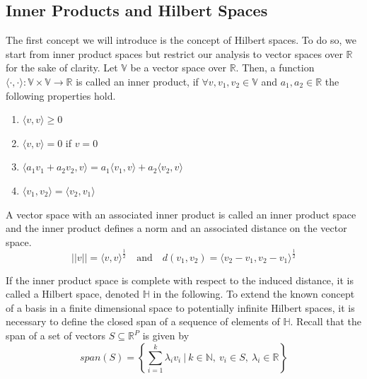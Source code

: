 \documentclass[11pt,twoside,a4paper]{article}
\begin{document}
	\subsection{Inner Products and Hilbert Spaces}
	The first concept we will introduce is the concept of Hilbert spaces. To do so, we start from inner product spaces but restrict our analysis to vector spaces over $\mathbb{R}$ for the sake of clarity. Let $\mathbb{V}$ be a vector space over $\mathbb{R}$.  Then, a function $\langle \cdot, \cdot \rangle : \mathbb{V} \times  \mathbb{V} \rightarrow \mathbb{R}$ is called an inner product, if $\forall v, v_1, v_2 \in \mathbb{V}$ and $a_1, a_2 \in \mathbb{R}$ the following properties hold.
	
	\begin{multicols}{2}
		\begin{enumerate}
			\item $\langle v, v \rangle \geq 0$
			\item $\langle v, v \rangle = 0$ if $v = 0$
			\item $\langle a_1 v_1 + a_2 v_2, v \rangle = a_1 \langle v_1, v \rangle + a_2 \langle v_2, v \rangle$
			\item $\langle v_1, v_2 \rangle = \langle v_2, v_1 \rangle$
		\end{enumerate}
	\end{multicols}

	A vector space with an associated inner product is called an inner product space and the inner product defines a norm and an associated distance on the vector space.
	\begin{equation}
		\lvert \lvert v \rvert \rvert = {\langle v, v \rangle}^{\frac{1}{2}} \quad \text{and} \quad 
		d(v_1, v_2) = {\langle v_2 - v_1, v_2 - v_1 \rangle}^{\frac{1}{2}}
	\end{equation}
	
	If the inner product space is complete with respect to the induced distance, it is called a Hilbert space, denoted $\mathbb{H}$ in the following. To extend the known concept of a basis in a finite dimensional space to potentially infinite Hilbert spaces, it is necessary to define the closed span of a sequence of elements of $\mathbb{H}$. Recall that the span of a set of vectors $S \subseteq \mathbb{R}^P$ is given by
	\begin{equation}
		span(S) = \left\{\sum_{i = 1}^{k} \lambda_i v_i \: \bigg\vert \: k \in \mathbb{N}, \: v_i \in S, \: \lambda_i \in \mathbb{R} \right\}
	\end{equation}
			
\end{document}
